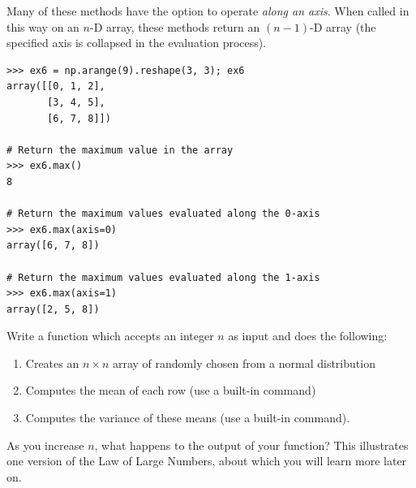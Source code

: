 Many of these methods have the option to operate \emph{along an axis}. When called in this way on an $n$-D array, these methods return an $(n-1)$-D array (the specified axis is collapsed in the evaluation process).

\begin{lstlisting}
>>> ex6 = np.arange(9).reshape(3, 3); ex6
array([[0, 1, 2],
       [3, 4, 5],
       [6, 7, 8]])
       
# Return the maximum value in the array
>>> ex6.max() 
8

# Return the maximum values evaluated along the 0-axis
>>> ex6.max(axis=0)
array([6, 7, 8])

# Return the maximum values evaluated along the 1-axis
>>> ex6.max(axis=1)
array([2, 5, 8])
\end{lstlisting}


\begin{problem}
Write a function which accepts an integer $n$ as input and does the following:
\begin{enumerate}
\item Creates an $n\times n$ array of  randomly chosen from a normal distribution
\item Computes the mean of each row (use a built-in command)
\item Computes the variance of these means (use a built-in command).
\end{enumerate}
As you increase $n$, what happens to the output of 
your function? This illustrates one version of
the Law of Large Numbers, about which you will learn more later on.
\end{problem}

